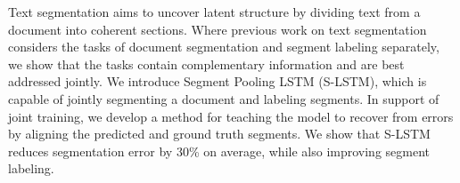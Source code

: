 Text segmentation aims to uncover latent structure by dividing text from a document into coherent sections. Where previous work on text segmentation considers the tasks of document segmentation and segment labeling separately, we show that the tasks contain complementary information and are best addressed jointly. We introduce Segment Pooling LSTM (S-LSTM), which is capable of jointly segmenting a document and labeling segments. In support of joint training, we develop a method for teaching the model to recover from errors by aligning the predicted and ground truth segments. We show that S-LSTM reduces segmentation error by 30\% on average, while also improving segment labeling.
